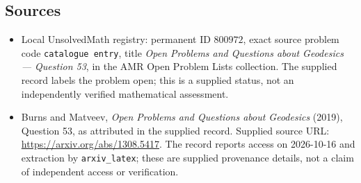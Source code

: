\documentclass[11pt]{article}
\begin{document}
\subsection{Sources}
\begin{itemize}
\item Local UnsolvedMath registry: permanent ID \(800972\), exact source problem code \texttt{catalogue entry}, title \emph{Open Problems and Questions about Geodesics --- Question 53}, in the AMR Open Problem Lists collection. The supplied record labels the problem open; this is a supplied status, not an independently verified mathematical assessment.
\item Burns and Matveev, \emph{Open Problems and Questions about Geodesics} (2019), Question 53, as attributed in the supplied record. Supplied source URL: \url{https://arxiv.org/abs/1308.5417}. The record reports access on 2026-10-16 and extraction by \texttt{arxiv\_latex}; these are supplied provenance details, not a claim of independent access or verification.
\end{itemize}
\end{document}
